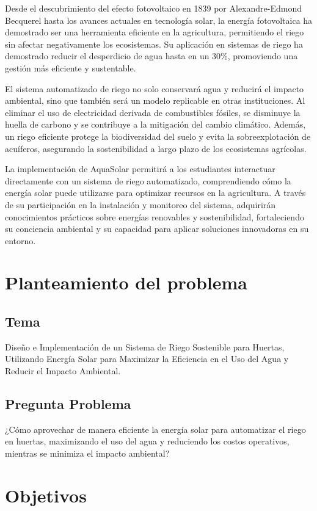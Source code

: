 \documentclass[12pt]{article}
\begin{document}
Desde el descubrimiento del efecto fotovoltaico en 1839 por Alexandre-Edmond Becquerel hasta los avances actuales en tecnología solar, la energía fotovoltaica ha demostrado ser una herramienta eficiente en la agricultura, permitiendo el riego sin afectar negativamente los ecosistemas. Su aplicación en sistemas de riego ha demostrado reducir el desperdicio de agua hasta en un 30\%, promoviendo una gestión más eficiente y sustentable.

El sistema automatizado de riego no solo conservará agua y reducirá el impacto ambiental, sino que también será un modelo replicable en otras instituciones. Al eliminar el uso de electricidad derivada de combustibles fósiles, se disminuye la huella de carbono y se contribuye a la mitigación del cambio climático. Además, un riego eficiente protege la biodiversidad del suelo y evita la sobreexplotación de acuíferos, asegurando la sostenibilidad a largo plazo de los ecosistemas agrícolas.

La implementación de AquaSolar permitirá a los estudiantes interactuar directamente con un sistema de riego automatizado, comprendiendo cómo la energía solar puede utilizarse para optimizar recursos en la agricultura. A través de su participación en la instalación y monitoreo del sistema, adquirirán conocimientos prácticos sobre energías renovables y sostenibilidad, fortaleciendo su conciencia ambiental y su capacidad para aplicar soluciones innovadoras en su entorno.
\newpage
\section{Planteamiento del problema}
\subsection{Tema}
Diseño e Implementación de un Sistema de Riego Sostenible para Huertas, Utilizando Energía Solar para Maximizar la Eficiencia en el Uso del Agua y Reducir el Impacto Ambiental.

\subsection{Pregunta Problema}
¿Cómo aprovechar de manera eficiente la energía solar para automatizar el riego en huertas, maximizando el uso del agua y reduciendo los costos operativos, mientras se minimiza el impacto ambiental?
\newpage
\section{Objetivos}
\end{document}
